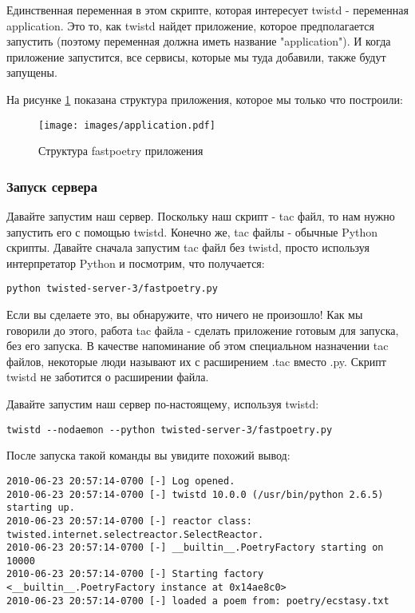 Единственная переменная в этом скрипте, которая 
интересует twistd - переменная application. Это то, как 
twistd найдет приложение, которое предполагается запустить (поэтому 
переменная должна иметь название "application"). И когда 
приложение запустится, все сервисы, которые мы туда добавили, 
также будут запущены.


На рисунке \ref{fig:application} показана структура приложения, 
которое мы только что построили:

\begin{figure}[h]
\begin{center}
    \texttt{[image: images/application.pdf]}
    \caption{Структура fastpoetry приложения\label{fig:application}}
\end{center}
\end{figure}


\subsubsection{Запуск сервера}


Давайте запустим наш сервер. 
Поскольку наш скрипт - tac файл, то нам нужно запустить его с помощью twistd.  
Конечно же, tac файлы - обычные Python скрипты. 
Давайте сначала запустим tac файл без twistd, 
просто используя интерпретатор Python и посмотрим, что получается:

 \begin{verbatim}
python twisted-server-3/fastpoetry.py
\end{verbatim} 


Если вы сделаете это, вы обнаружите, что ничего не произошло! 
Как мы говорили до этого, работа tac файла - сделать приложение 
готовым для запуска, без его запуска. В качестве напоминание об этом 
специальном назначении tac файлов, некоторые люди называют их с 
расширением .tac вместо .py. Скрипт twistd не заботится о 
расширении файла.


Давайте запустим наш сервер по-настоящему, используя twistd:

 \begin{verbatim}
twistd --nodaemon --python twisted-server-3/fastpoetry.py
\end{verbatim} 


После запуска такой команды вы увидите похожий вывод:

 \begin{verbatim}
2010-06-23 20:57:14-0700 [-] Log opened.
2010-06-23 20:57:14-0700 [-] twistd 10.0.0 (/usr/bin/python 2.6.5) starting up.
2010-06-23 20:57:14-0700 [-] reactor class: twisted.internet.selectreactor.SelectReactor.
2010-06-23 20:57:14-0700 [-] __builtin__.PoetryFactory starting on 10000
2010-06-23 20:57:14-0700 [-] Starting factory <__builtin__.PoetryFactory instance at 0x14ae8c0>
2010-06-23 20:57:14-0700 [-] loaded a poem from: poetry/ecstasy.txt
\end{verbatim} 

